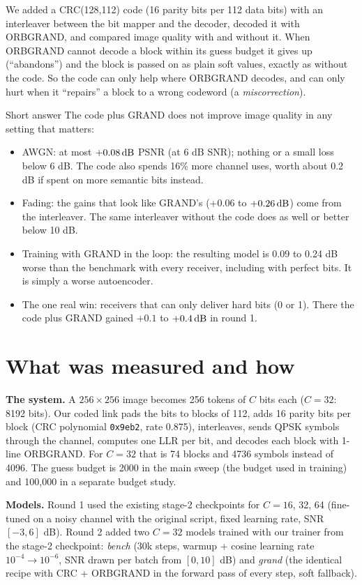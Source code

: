 \documentclass{article}
\begin{document}
We added a CRC(128,112) code (16 parity bits per 112 data bits) with an interleaver between the bit
mapper and the decoder, decoded it with ORBGRAND, and compared image quality with and without it. When
ORBGRAND cannot decode a block within its guess budget it gives up (``abandons'') and the block is
passed on as plain soft values, exactly as without the code. So the code can only help where ORBGRAND
decodes, and can only hurt when it ``repairs'' a block to a wrong codeword (a \emph{miscorrection}).

\begin{findingbox}{Short answer}
The code plus GRAND does not improve image quality in any setting that matters:
\begin{itemize}
\item AWGN: at most $+0.08\,\mathrm{dB}$ PSNR (at 6 dB SNR); nothing or a small loss below 6 dB. The code
also spends 16\% more channel uses, worth about 0.2 dB if spent on more semantic bits instead.
\item Fading: the gains that look like GRAND's ($+0.06$ to $+0.26\,\mathrm{dB}$) come from the interleaver. The
same interleaver without the code does as well or better below 10 dB.
\item Training with GRAND in the loop: the resulting model is 0.09 to 0.24 dB worse than the benchmark
with every receiver, including with perfect bits. It is simply a worse autoencoder.
\item The one real win: receivers that can only deliver hard bits (0 or 1). There the code plus GRAND
gained $+0.1$ to $+0.4\,\mathrm{dB}$ in round 1.
\end{itemize}
\end{findingbox}

\section{What was measured and how}

\textbf{The system.} A $256\times256$ image becomes 256 tokens of $C$ bits each ($C=32$: 8192 bits).
Our coded link pads the bits to blocks of 112, adds 16 parity bits per block (CRC polynomial
\texttt{0x9eb2}, rate 0.875), interleaves, sends QPSK symbols through the channel, computes one LLR per
bit, and decodes each block with 1-line ORBGRAND. For $C=32$ that is 74 blocks and 4736 symbols instead
of 4096. The guess budget is 2000 in the main sweep (the budget used in training) and 100{,}000 in a
separate budget study.

\textbf{Models.} Round 1 used the existing stage-2 checkpoints for $C=16$, 32, 64 (fine-tuned on a noisy
channel with the original script, fixed learning rate, SNR $[-3,6]$ dB). Round 2 added two $C=32$
models trained with our trainer from the stage-2 checkpoint: \emph{bench} (30k steps, warmup + cosine
learning rate $10^{-4}\to10^{-6}$, SNR drawn per batch from $[0,10]$ dB) and \emph{grand} (the identical
recipe with CRC + ORBGRAND in the forward pass of every step, soft fallback).
\end{document}
